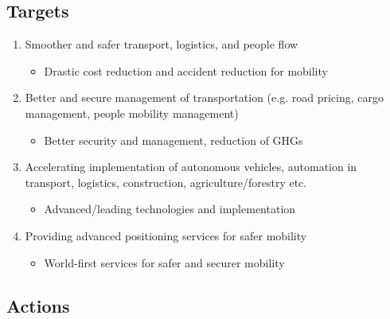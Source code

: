 \subsection{Targets}

\begin{enumerate}

\item Smoother and safer transport, logistics, and people flow 

\begin{itemize}
\item Drastic cost reduction and accident reduction for mobility
\end{itemize}

\item Better and secure management of transportation (e.g. road pricing, cargo management, people mobility management)

\begin{itemize}
\item Better security and management, reduction of GHGs
\end{itemize}

\item Accelerating implementation of  autonomous vehicles, automation in transport, logistics, construction, agriculture/forestry etc.

\begin{itemize}
\item Advanced/leading technologies and implementation
\end{itemize}

\item Providing advanced positioning services for safer mobility

\begin{itemize}
\item World-first services for safer and securer mobility
\end{itemize}

\end{enumerate}

\subsection{Actions}

